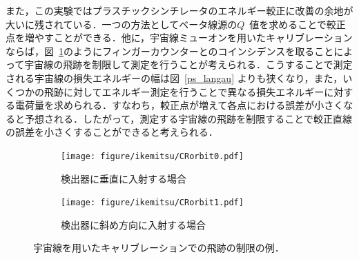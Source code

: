 また，この実験ではプラスチックシンチレータのエネルギー較正に改善の余地が大いに残されている．一つの方法としてベータ線源の$Q$~値を求めることで較正点を増やすことができる．他に，宇宙線ミューオンを用いたキャリブレーションならば，図~\ref{kadai_calib}のようにフィンガーカウンターとのコインシデンスを取ることによって宇宙線の飛跡を制限して測定を行うことが考えられる．こうすることで測定される宇宙線の損失エネルギーの幅は図~\ref{ps_langau} よりも狭くなり，また，いくつかの飛跡に対してエネルギー測定を行うことで異なる損失エネルギーに対する電荷量を求められる．すなわち，較正点が増えて各点における誤差が小さくなると予想される．したがって，測定する宇宙線の飛跡を制限することで較正直線の誤差を小さくすることができると考えられる．
\begin{figure}[H]
 \centering
 \begin{subfigure}{0.4\columnwidth}
  \centering
  \texttt{[image: figure/ikemitsu/CRorbit0.pdf]}
  \caption{検出器に垂直に入射する場合}
 \end{subfigure}
 \hspace{2zw}
 \begin{subfigure}{0.4\columnwidth}
  \centering
  \texttt{[image: figure/ikemitsu/CRorbit1.pdf]}  
  \caption{検出器に斜め方向に入射する場合}
 \end{subfigure}
 \caption{宇宙線を用いたキャリブレーションでの飛跡の制限の例．}
 \label{kadai_calib}
\end{figure}






